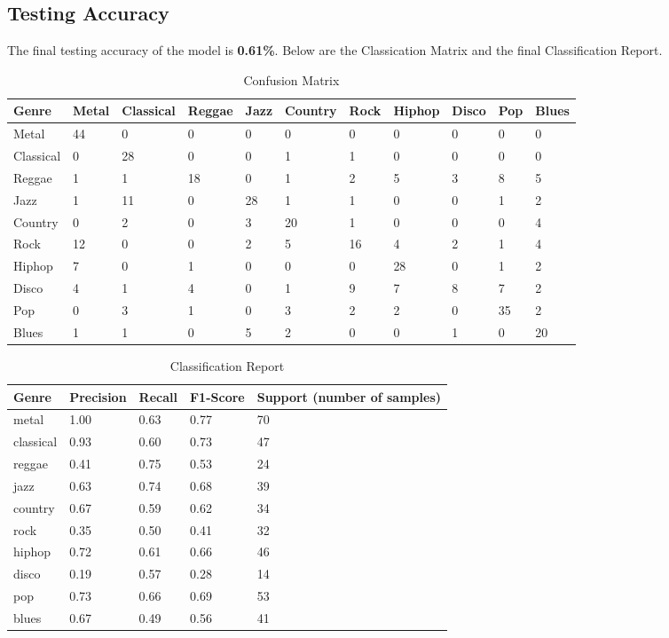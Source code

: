 \documentclass{article}
\begin{document}
\subsection{Testing Accuracy}

The final testing accuracy of the model is \textbf{0.61\%}. Below are the Classication Matrix and the final 
Classification Report.

\begin{table}[h]
  \caption{Confusion Matrix}
  \centering
  \begin{tabular}{l | llllllllll}
    Genre & Metal & Classical & Reggae & Jazz & Country & Rock & Hiphop & Disco & Pop & Blues \\
    \midrule
    Metal & 44 & 0 & 0 & 0 & 0 & 0 & 0 & 0 & 0 & 0 \\
		Classical & 0 & 28 & 0 & 0 & 1 & 1 & 0 & 0 & 0 & 0 \\
		Reggae & 1 & 1 & 18 & 0 & 1 & 2 & 5 & 3 & 8 & 5 \\
    Jazz & 1 & 11 & 0 & 28 & 1 & 1 & 0 & 0 & 1 & 2 \\
		Country & 0 & 2 & 0 & 3 & 20 & 1 & 0 & 0 & 0 & 4 \\
		Rock & 12 & 0 & 0 & 2 & 5 & 16 & 4 & 2 & 1 & 4 \\
		Hiphop & 7 & 0 & 1 & 0 & 0 & 0 & 28 & 0 & 1 & 2 \\
		Disco & 4 & 1 & 4 & 0 & 1 & 9 & 7 & 8 & 7 & 2 \\
		Pop & 0 & 3 & 1 & 0 & 3 & 2 & 2 & 0 & 35 & 2 \\
		Blues & 1 & 1 & 0 & 5 & 2 & 0 & 0 & 1 & 0 & 20 \\
    \bottomrule
  \end{tabular}
\end{table}

\begin{table}[h]
  \caption{Classification Report}
  \centering
  \begin{tabular}{l | l l l l}
    Genre & Precision & Recall & F1-Score & Support (number of samples) \\
    \midrule
       metal   &    1.00   &   0.63  &    0.77    &    70 \\
   classical    &   0.93    &  0.60  &    0.73    &    47 \\
      reggae    &   0.41    &  0.75   &   0.53    &    24 \\
        jazz    &   0.63    &  0.74   &   0.68    &    39 \\
     country    &   0.67    &  0.59   &   0.62    &    34 \\
        rock    &   0.35    &  0.50   &   0.41    &    32 \\
      hiphop    &   0.72    &  0.61   &   0.66    &    46 \\
       disco    &   0.19    &  0.57   &   0.28    &    14 \\
         pop    &   0.73    &  0.66   &   0.69    &    53 \\
       blues    &   0.67   &   0.49   &   0.56   &     41 \\
    \bottomrule
  \end{tabular}
\end{table}
\end{document}
